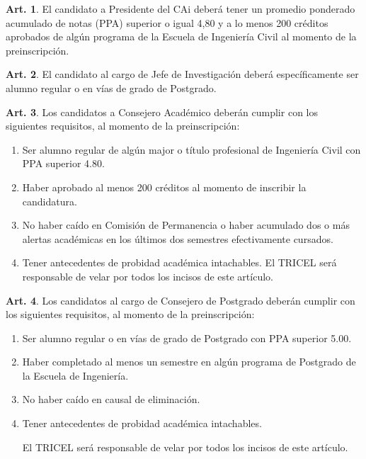 \documentclass[letterpaper,11pt]{article}
\theoremstyle{definition}%
\newtheorem{art}{Art.} %
\begin{document}
\begin{art}\label{requisitosPresidente}
	El candidato a Presidente del CAi deberá tener un promedio ponderado acumulado de notas (PPA) superior o igual 4,80 y a lo menos 200 créditos aprobados de algún programa de la Escuela de Ingeniería Civil al momento de la preinscripción.
\end{art}

\begin{art}\label{requisitosJefeInvestigacion}
	El candidato al cargo de Jefe de Investigación deberá específicamente ser alumno regular o en vías de grado de Postgrado.
\end{art}

\begin{art}\label{requisitosCAPregrado}
	Los candidatos a Consejero Académico deberán cumplir con los siguientes requisitos, al momento de la preinscripción:
	\begin{enumerate}
		\item Ser alumno regular de algún major o título profesional de Ingeniería Civil con PPA superior 4.80.

		\item Haber aprobado al menos 200 créditos al momento de inscribir la candidatura.

		\item No haber caído en Comisión de Permanencia o haber acumulado dos o más alertas académicas en los últimos dos semestres efectivamente cursados.

		\item Tener antecedentes de probidad académica intachables.
		      El TRICEL será responsable de velar por todos los incisos de este artículo.
	\end{enumerate}
\end{art}

\begin{art}\label{requisitosCAPostegrado}
	Los candidatos al cargo de Consejero de Postgrado deberán cumplir con los siguientes requisitos, al momento de la preinscripción:
	\begin{enumerate}
		\item Ser alumno regular o en vías de grado de Postgrado con PPA superior 5.00.

		\item Haber completado al menos un semestre en algún programa de Postgrado de la Escuela de Ingeniería.

		\item No haber caído en causal de eliminación.

		\item Tener antecedentes de probidad académica intachables.

		      El TRICEL será responsable de velar por todos los incisos de este artículo.
	\end{enumerate}
\end{art}
\end{document}
